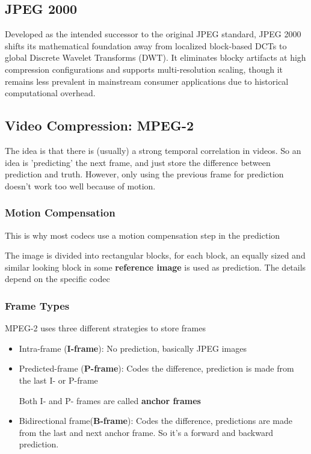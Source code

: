 \documentclass{article}
\begin{document}
\subsection{JPEG 2000}
Developed as the intended successor to the original JPEG standard, JPEG 2000 shifts its mathematical foundation away from localized block-based DCTs to global Discrete Wavelet Transforms (DWT). It eliminates blocky artifacts at high compression configurations and supports multi-resolution scaling, though it remains less prevalent in mainstream consumer applications due to historical computational overhead.

\subsection{Video Compression: MPEG-2}
The idea is that there is (usually) a strong temporal correlation in videos. So an idea is 'predicting' the next frame, and just store the difference between prediction and truth. However, only using the previous frame for prediction doesn't work too well because of motion.

\subsubsection{Motion Compensation}
This is why most codecs use a motion compensation step in the prediction

The image is divided into rectangular blocks, for each block, an equally sized and similar looking block in some \textbf{reference image} is used as prediction. The details depend on the specific codec

\subsubsection{Frame Types}
MPEG-2 uses three different strategies to store frames
\begin{itemize}
  \item Intra-frame (\textbf{I-frame}): No prediction, basically JPEG images
  \item Predicted-frame (\textbf{P-frame}): Codes the difference, prediction is made from the last I- or P-frame
  
  Both I- and P- frames are called \textbf{anchor frames}
  \item Bidirectional frame(\textbf{B-frame}): Codes the difference, predictions are made from the last and next anchor frame. So it's a forward and backward prediction.
\end{itemize}
\end{document}
